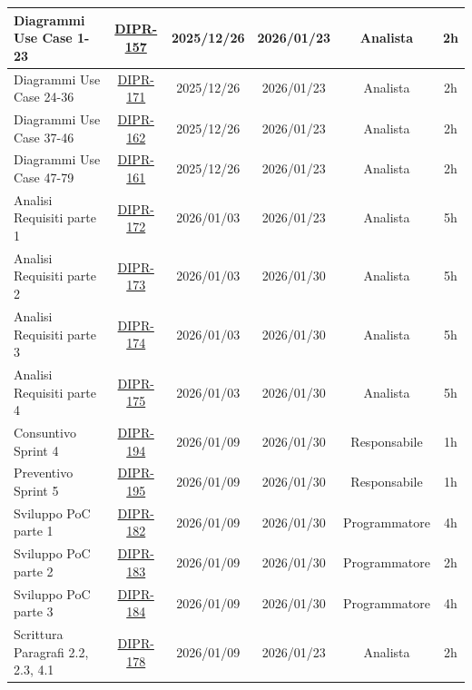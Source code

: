 \documentclass[a4paper,12pt]{article}
\begin{document}
\begin{longtable}{|p{4cm}|c|c|c|c|c|}
    \hline
    Diagrammi Use Case 1-23 & \href{https://7zpus.atlassian.net/browse/DIPR-157}{DIPR-157} & 2025/12/26 & 2026/01/23 & Analista & 2h \\
    \hline
    Diagrammi Use Case 24-36 & \href{https://7zpus.atlassian.net/browse/DIPR-171}{DIPR-171} & 2025/12/26 & 2026/01/23 & Analista & 2h \\
    \hline
    Diagrammi Use Case 37-46 & \href{https://7zpus.atlassian.net/browse/DIPR-162}{DIPR-162} & 2025/12/26 & 2026/01/23 & Analista & 2h \\
    \hline
    Diagrammi Use Case 47-79 & \href{https://7zpus.atlassian.net/browse/DIPR-161}{DIPR-161} & 2025/12/26 & 2026/01/23 & Analista & 2h \\
    \hline
    Analisi Requisiti parte 1 & \href{https://7zpus.atlassian.net/browse/DIPR-172}{DIPR-172} & 2026/01/03 & 2026/01/23 & Analista & 5h \\
    \hline
    Analisi Requisiti parte 2 & \href{https://7zpus.atlassian.net/browse/DIPR-173}{DIPR-173} & 2026/01/03 & 2026/01/30 & Analista & 5h \\
    \hline
    Analisi Requisiti parte 3 & \href{https://7zpus.atlassian.net/browse/DIPR-174}{DIPR-174} & 2026/01/03 & 2026/01/30 & Analista & 5h \\
    \hline
    Analisi Requisiti parte 4 & \href{https://7zpus.atlassian.net/browse/DIPR-175}{DIPR-175} & 2026/01/03 & 2026/01/30 & Analista & 5h \\
    \hline
    Consuntivo Sprint 4 & \href{https://7zpus.atlassian.net/browse/DIPR-194}{DIPR-194} & 2026/01/09 & 2026/01/30 & Responsabile & 1h \\
    \hline
    Preventivo Sprint 5 & \href{https://7zpus.atlassian.net/browse/DIPR-195}{DIPR-195} & 2026/01/09 & 2026/01/30 & Responsabile & 1h \\
    \hline
    Sviluppo PoC parte 1 & \href{https://7zpus.atlassian.net/browse/DIPR-182}{DIPR-182} & 2026/01/09 & 2026/01/30 & Programmatore & 4h \\
    \hline
    Sviluppo PoC parte 2 & \href{https://7zpus.atlassian.net/browse/DIPR-183}{DIPR-183} & 2026/01/09 & 2026/01/30 & Programmatore & 2h \\
    \hline
    Sviluppo PoC parte 3 & \href{https://7zpus.atlassian.net/browse/DIPR-184}{DIPR-184} & 2026/01/09 & 2026/01/30 & Programmatore & 4h \\
    \hline
    Scrittura Paragrafi 2.2, 2.3, 4.1 & \href{https://7zpus.atlassian.net/browse/DIPR-178}{DIPR-178} & 2026/01/09 & 2026/01/23 & Analista & 2h \\

\end{longtable}
\end{document}
